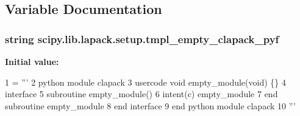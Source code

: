 \subsection{Variable Documentation}
\hypertarget{namespacescipy_1_1lib_1_1lapack_1_1setup_a3cbafb2240313264a4a5ff18cc8ad248}{}
\subsubsection[{tmpl\+\_\+empty\+\_\+clapack\+\_\+pyf}]{\setlength{\rightskip}{0pt plus 5cm}string scipy.\+lib.\+lapack.\+setup.\+tmpl\+\_\+empty\+\_\+clapack\+\_\+pyf}\label{namespacescipy_1_1lib_1_1lapack_1_1setup_a3cbafb2240313264a4a5ff18cc8ad248}
{\bfseries Initial value\+:}
\begin{DoxyCode}
1 = \textcolor{stringliteral}{'''}
2 \textcolor{stringliteral}{python module clapack}
3 \textcolor{stringliteral}{  usercode void empty\_module(void) \{\}}
4 \textcolor{stringliteral}{  interface}
5 \textcolor{stringliteral}{    subroutine empty\_module()}
6 \textcolor{stringliteral}{      intent(c) empty\_module}
7 \textcolor{stringliteral}{    end subroutine empty\_module}
8 \textcolor{stringliteral}{  end interface}
9 \textcolor{stringliteral}{end python module clapack}
10 \textcolor{stringliteral}{'''}
\end{DoxyCode}
